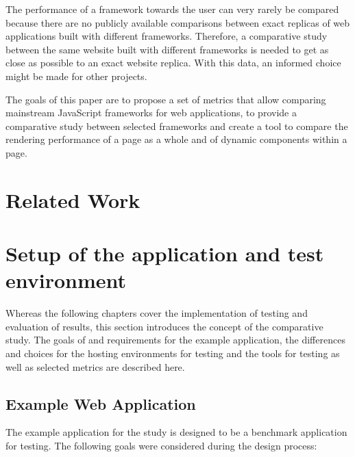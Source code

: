 \documentclass[a4paper, 12pt]{article}
\begin{document}
The performance of a framework towards the user can very rarely be compared because there are no publicly available comparisons between exact replicas of web applications built with different frameworks.
Therefore, a comparative study between the same website built with different frameworks is needed to get as close as possible to an exact website replica.
With this data, an informed choice might be made for other projects.

The goals of this paper are to propose a set of metrics that allow comparing mainstream JavaScript frameworks for web applications, to provide a comparative study between selected frameworks and create a tool to compare the rendering performance of a page as a whole and of dynamic components within a page.

\section{Related Work}\label{sec:relatedwork}

\section{Setup of the application and test environment}\label{sec:design}

Whereas the following chapters cover the implementation of testing and evaluation of results, this section introduces the concept of the comparative study.
The goals of and requirements for the example application, the differences and choices for the hosting environments for testing and the tools for testing as well as selected metrics are described here.

\subsection{Example Web Application}\label{subsec:exampleapplication}
%
% 

The example application for the study is designed to be a benchmark application for testing.
The following goals were considered during the design process:
\end{document}
